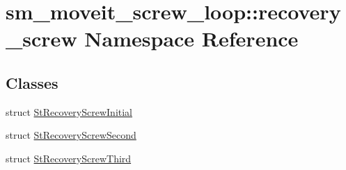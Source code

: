 \hypertarget{namespacesm__moveit__screw__loop_1_1recovery__screw}{}\section{sm\+\_\+moveit\+\_\+screw\+\_\+loop\+:\+:recovery\+\_\+screw Namespace Reference}
\label{namespacesm__moveit__screw__loop_1_1recovery__screw}
\subsection*{Classes}
\begin{DoxyCompactItemize}
\item 
struct \hyperlink{structsm__moveit__screw__loop_1_1recovery__screw_1_1StRecoveryScrewInitial}{St\+Recovery\+Screw\+Initial}
\item 
struct \hyperlink{structsm__moveit__screw__loop_1_1recovery__screw_1_1StRecoveryScrewSecond}{St\+Recovery\+Screw\+Second}
\item 
struct \hyperlink{structsm__moveit__screw__loop_1_1recovery__screw_1_1StRecoveryScrewThird}{St\+Recovery\+Screw\+Third}
\end{DoxyCompactItemize}
